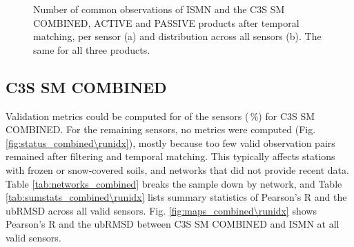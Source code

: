 \begin{figure}[ht!]
\centering
\begin{minipage}[c]{0.64\textwidth}
    \centering
    \subcaption{} %
\end{minipage}%
\hfill
\begin{minipage}[c]{0.34\textwidth}
    \centering
    \subcaption{} %
\end{minipage}
\caption{Number of common observations of \ac{ISMN} and the \ac{C3S} SM COMBINED, ACTIVE and PASSIVE products after temporal matching, per sensor (a) and distribution across all sensors (b). The same for all three products.}
\label{fig:nobs\runidx}
\end{figure}

\FloatBarrier

\subsection{\ac{C3S} SM COMBINED} \label{ssec:results_combined}

\noindent Validation metrics could be computed for \textbf{} of the  sensors (\,\%) for \ac{C3S} SM COMBINED.
For the remaining  sensors, no metrics were computed (Fig. \ref{fig:status_combined\runidx}), mostly because too few valid observation pairs remained after filtering and temporal matching.
This typically affects stations with frozen or snow-covered soils, and networks that did not provide recent data.
Table \ref{tab:networks_combined} breaks the sample down by network, and Table \ref{tab:sumstats_combined\runidx} lists summary statistics of Pearson's R and the \ac{ubRMSD} across all valid sensors.
Fig. \ref{fig:maps_combined\runidx} shows Pearson's R and the \ac{ubRMSD} between \ac{C3S} SM COMBINED and \ac{ISMN} at all valid sensors.

